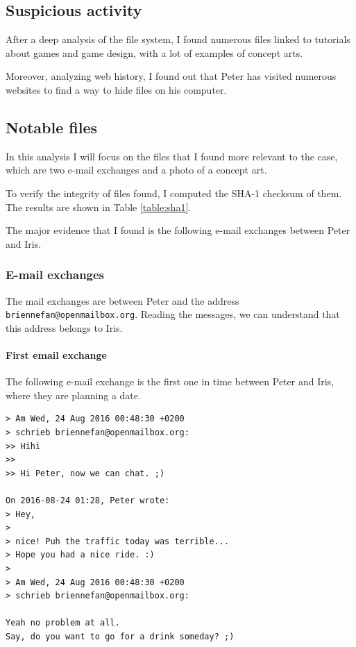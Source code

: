 \documentclass[12pt]{article}
\begin{document}
\subsection{Suspicious activity}

After a deep analysis of the file system, I found numerous files linked to tutorials about games and game design, with a lot of examples of concept arts. 

Moreover, analyzing web history, I found out that Peter has visited numerous websites to find a way to hide files on his computer. 

\subsection{Notable files}

In this analysis I will focus on the files that I found more relevant to the case, which are two e-mail exchanges and a photo of a concept art.

To verify the integrity of files found, I computed the SHA-1 checksum of them. The results are shown in Table \ref{table:sha1}.

The major evidence that I found is the following e-mail exchanges between Peter and Iris.

\subsubsection{E-mail exchanges}

The mail exchanges are between Peter and the address \texttt{briennefan@openmailbox.org}. Reading the messages, we can understand that this
address belongs to Iris.

\paragraph{First email exchange}
\label{sec:first-mail}

The following e-mail exchange is the first one in time between Peter and Iris, where they are planning a date.

\begin{shaded}
\begin{verbatim}
> Am Wed, 24 Aug 2016 00:48:30 +0200
> schrieb briennefan@openmailbox.org:
>> Hihi
>> 
>> Hi Peter, now we can chat. ;)

On 2016-08-24 01:28, Peter wrote:
> Hey,
> 
> nice! Puh the traffic today was terrible...
> Hope you had a nice ride. :)
> 
> Am Wed, 24 Aug 2016 00:48:30 +0200
> schrieb briennefan@openmailbox.org:

Yeah no problem at all.
Say, do you want to go for a drink someday? ;)
\end{verbatim}
\end{shaded}
\end{document}
